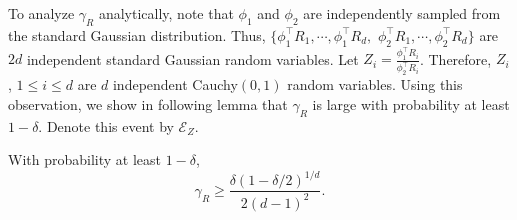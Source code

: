\documentclass[twoside,11pt]{article}
\newcommand{\EZ}{\mathcal{E}_{Z}}
\begin{document}




To analyze $\gamma_R$ analytically,
note that $\phi_1$ and $\phi_2$ are independently sampled from the  standard Gaussian distribution. 
Thus, $\{\phi_1^{\top}R_1, \cdots, \phi_1^{\top}R_d,$ $\phi_2^{\top}R_1, \cdots, \phi_2^{\top}R_d\}$ are $2d$ independent standard Gaussian random variables. 
Let $Z_i = \frac{\phi_1^{\top}R_i}{\phi_2^{\top}R_i}$. Therefore, $Z_i$, $1\le i\le d$ are $d$ independent Cauchy$(0,1)$ random variables. Using this observation, we show in following lemma that $\gamma_R$ is large with probability at least $1-\delta$. Denote this event by $\EZ$.

\begin{proposition}
\label{prop:CauchyGap}
With probability at least $1-\delta$,
\[
\gamma_R \ge \frac{\delta(1-\delta/2)^{1/d}}{2(d-1)^2}.
\]
\end{proposition}

\end{document}
